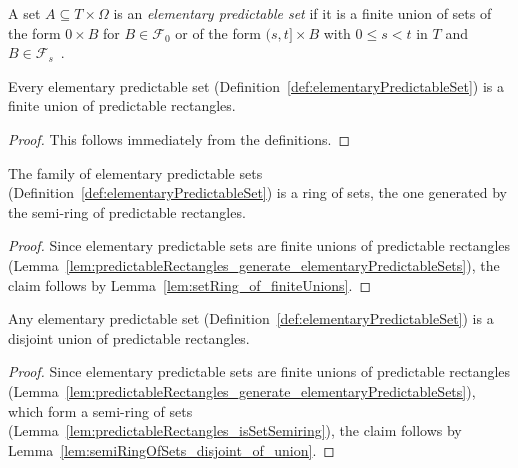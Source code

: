 \begin{definition}\label{def:elementaryPredictableSet}
  \leanok
A set $A \subseteq T \times \Omega$ is an \emph{elementary predictable set} if it is a finite union of sets of the form ${0} \times B$ for $B \in \mathcal{F}_0$ or of the form $(s, t] \times B$ with $0 \le s < t$ in $T$ and $B \in \mathcal{F}_s$~.
\end{definition}


\begin{lemma}\label{lem:predictableRectangles_generate_elementaryPredictableSets}
  Every elementary predictable set (Definition~\ref{def:elementaryPredictableSet})
  is a finite union of predictable rectangles.
\end{lemma}

\begin{proof}
  This follows immediately from the definitions.
\end{proof}

\begin{lemma}\label{lem:elementaryPredictableSets_isSetRing_of}
  The family of elementary predictable sets (Definition~\ref{def:elementaryPredictableSet})
  is a ring of sets, the one generated by the semi-ring of predictable rectangles.
\end{lemma}

\begin{proof}
  Since elementary predictable sets are finite unions of predictable rectangles
  (Lemma~\ref{lem:predictableRectangles_generate_elementaryPredictableSets}),
  the claim follows by Lemma~\ref{lem:setRing_of_finiteUnions}.
\end{proof}

\begin{lemma}\label{lem:elementaryPredictableSets_asDisjointUnions}
  Any elementary predictable set (Definition~\ref{def:elementaryPredictableSet})
  is a disjoint union of predictable rectangles.
\end{lemma}

\begin{proof}
  Since elementary predictable sets are finite unions of predictable rectangles
  (Lemma~\ref{lem:predictableRectangles_generate_elementaryPredictableSets}),
  which form a semi-ring of sets (Lemma~\ref{lem:predictableRectangles_isSetSemiring}),
  the claim follows by Lemma~\ref{lem:semiRingOfSets_disjoint_of_union}.
\end{proof}


